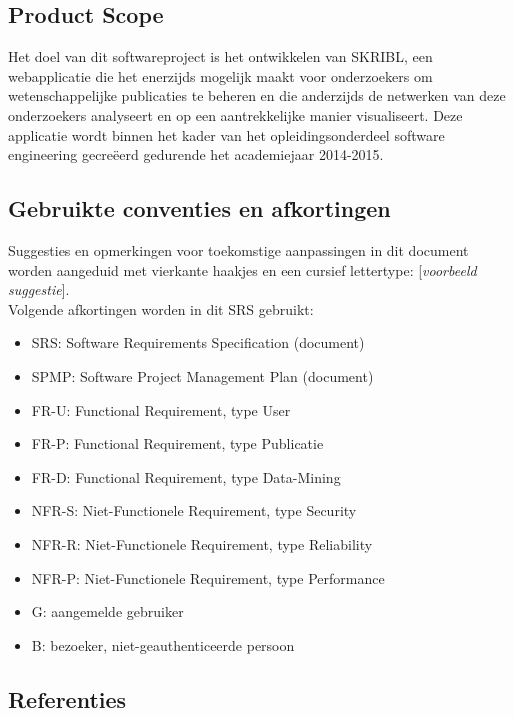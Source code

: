 \documentclass{article}
\begin{document}
\subsection{Product Scope}
Het doel van dit softwareproject is het ontwikkelen van SKRIBL, een webapplicatie die het enerzijds mogelijk maakt voor onderzoekers om wetenschappelijke publicaties te beheren en die anderzijds de netwerken van deze onderzoekers analyseert en op een aantrekkelijke manier visualiseert. Deze applicatie wordt binnen het kader van het opleidingsonderdeel software engineering gecre\"{e}erd gedurende het academiejaar 2014-2015.

\subsection{Gebruikte conventies en afkortingen}
Suggesties en opmerkingen voor toekomstige aanpassingen in dit document worden aangeduid met vierkante haakjes en een cursief lettertype: [{\it voorbeeld suggestie}]. \newline
\\
\noindent Volgende afkortingen worden in dit SRS gebruikt:
\begin{itemize}
\item SRS: Software Requirements Specification (document)
\item SPMP: Software Project Management Plan (document)
\item FR-U: Functional Requirement, type User
\item FR-P: Functional Requirement, type Publicatie
\item FR-D: Functional Requirement, type Data-Mining
\item NFR-S: Niet-Functionele Requirement, type Security
\item NFR-R: Niet-Functionele Requirement, type Reliability
\item NFR-P: Niet-Functionele Requirement, type Performance
\item G: aangemelde gebruiker
\item B: bezoeker, niet-geauthenticeerde persoon 
\end{itemize}


\subsection{Referenties}
\begingroup
\renewcommand{\section}[2]{}%

\endgroup
\end{document}
